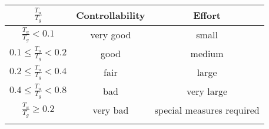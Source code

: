 \begin{center}
\begin{tabular}{|c|c|c|}
\hline
$\frac{T_{u}}{T_{g}}$ & Controllability & Effort \\ \hline
$\frac{T_{u}}{T_{g}} < 0.1$ & very good & small  \\ \hline
$0.1 \leq \frac{T_{u}}{T_{g}} < 0.2$ &  good & medium  \\ \hline
$0.2 \leq \frac{T_{u}}{T_{g}} < 0.4$ &  fair & large  \\ \hline
$0.4 \leq \frac{T_{u}}{T_{g}} < 0.8$ &  bad & very large  \\ \hline
$ \frac{T_{u}}{T_{g}} \geq 0.2$ &  very bad & special measures required  \\ \hline
	\label{table1}
\end{tabular}
\end{center}